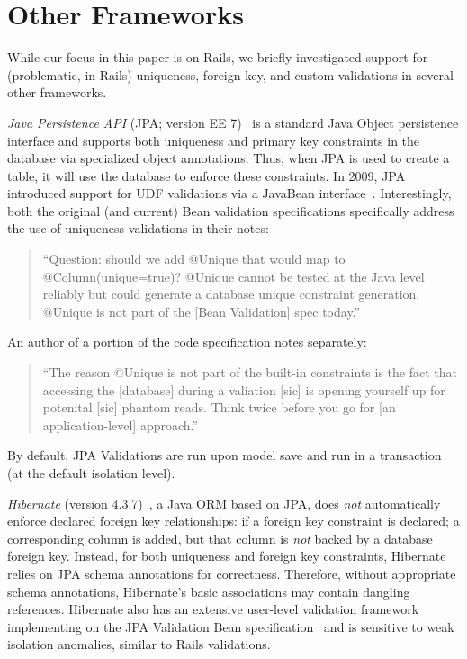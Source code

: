 
\section{Other Frameworks}
\label{sec:other-orms}

While our focus in this paper is on Rails, we briefly investigated
support for (problematic, in Rails) uniqueness, foreign key, and
custom validations in several other frameworks.

\newcommand{\orm}[1]{{\vspace{.45em}\noindent\textit{#1}}}

\orm{Java Persistence API} (JPA; version EE 7)~\cite{code-jpa} is a
standard Java Object persistence interface and supports both
uniqueness and primary key constraints in the database via specialized
object annotations. Thus, when JPA is used to create a table, it will
use the database to enforce these constraints. In 2009, JPA introduced
support for UDF validations via a JavaBean
interface~\cite{code-bean-validation}. Interestingly, both the
original (and current) Bean validation specifications specifically
address the use of uniqueness validations in their notes:
\begin{quote}
``Question: should we add @Unique that would map to @Column(unique=true)?
@Unique cannot be tested at the Java level reliably but could generate
a database unique constraint generation. @Unique is not part
of the [Bean Validation] spec today.''~\cite{jsr-bean}
\end{quote}
An author of a portion of the code specification notes separately:
\begin{quote}
  ``The reason @Unique is not part of the built-in constraints is the
  fact that accessing the [database] during a valiation [sic] is
  opening yourself up for potenital [sic] phantom reads. Think twice
  before you go for [an application-level] approach.''~\cite{unique-bean}
\end{quote}
By default, JPA Validations are run upon model save
and run in a transaction (at the default isolation level).

\orm{Hibernate} (version 4.3.7)~\cite{code-hibernate}, a Java ORM
based on JPA, does \textit{not} automatically enforce declared foreign
key relationships: if a foreign key constraint is declared; a
corresponding column is added, but that column is \textit{not} backed by a
database foreign key. Instead, for both uniqueness and foreign key
constraints, Hibernate relies on JPA schema annotations for
correctness. Therefore, without appropriate schema annotations,
Hibernate's basic associations may contain dangling references. Hibernate also has an extensive user-level validation
framework implementing on the JPA Validation Bean
specification~\cite{code-hibernate-validator} and is sensitive to weak
isolation anomalies, similar to Rails validations.

